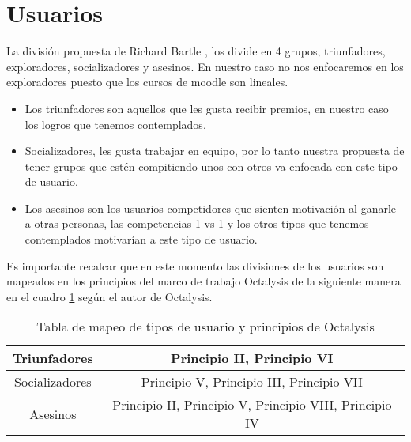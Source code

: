 \section{Usuarios}


 La división propuesta de Richard Bartle \cite{TiposDeUsuario}, los divide en 4 grupos, triunfadores,
 exploradores, socializadores y asesinos. En nuestro caso no nos enfocaremos en los exploradores
 puesto que los cursos de moodle son lineales.
    
    \begin{itemize}
    \item Los triunfadores son aquellos que les gusta recibir premios, en nuestro caso
          los logros que tenemos contemplados.

    \item Socializadores, les gusta trabajar en equipo, por lo tanto nuestra propuesta
          de tener grupos que estén compitiendo unos con otros va enfocada con este tipo
          de usuario.

    \item Los asesinos son los usuarios competidores que sienten motivación al ganarle
          a otras personas, las competencias 1 vs 1 y los otros tipos que tenemos
          contemplados motivarían a este tipo de usuario.
    \end{itemize}
    
 Es importante recalcar que en este momento las divisiones de los usuarios son mapeados en los principios
 del marco de trabajo Octalysis de la siguiente manera en el cuadro \ref{table:usuariosvprincipios} según
 el autor de Octalysis\cite[p. 414]{libro2}.
    
    \begin{table}[h!]
    \centering
    \begin{tabular}{|c|c|} \hline
        Triunfadores & Principio II, Principio VI \\ \hline
        Socializadores &  Principio V, Principio III, Principio VII\\\hline
        Asesinos & Principio II, Principio V, Principio VIII, Principio IV \\\hline
    \end{tabular}
    \caption{Tabla de mapeo de tipos de usuario y principios de Octalysis}
    \label{table:usuariosvprincipios}
    \end{table}
